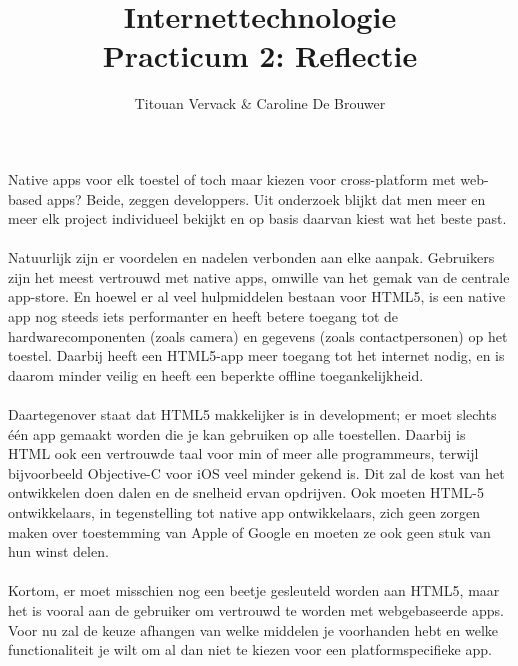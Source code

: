 \documentclass[12pt,a4paper,oneside]{article}
\begin{document}
\title{Internettechnologie \\ Practicum 2: Reflectie}
\author{Titouan Vervack \& Caroline De Brouwer}
\maketitle

\thispagestyle{empty}
Native apps voor elk toestel of toch maar kiezen voor cross-platform met web-based apps? Beide, zeggen developpers. Uit onderzoek blijkt dat men meer en meer elk project individueel bekijkt en op basis daarvan kiest wat het beste past. \\\\
Natuurlijk zijn er voordelen en nadelen verbonden aan elke aanpak. Gebruikers zijn het meest vertrouwd met native apps, omwille van het gemak van de centrale app-store. En hoewel er al veel hulpmiddelen bestaan voor HTML5, is een native app nog steeds iets performanter en heeft betere toegang tot de hardwarecomponenten (zoals camera) en gegevens (zoals contactpersonen) op het toestel. Daarbij heeft een HTML5-app meer toegang tot het internet nodig, en is daarom minder veilig en heeft een beperkte offline toegankelijkheid.\\\\
Daartegenover staat dat HTML5 makkelijker is in development; er moet slechts \'e\'en app gemaakt worden die je kan gebruiken op alle toestellen. Daarbij is HTML ook een vertrouwde taal voor min of meer alle programmeurs, terwijl bijvoorbeeld Objective-C voor iOS veel minder gekend is. Dit zal de kost van het ontwikkelen doen dalen en de snelheid ervan opdrijven. Ook moeten HTML-5 ontwikkelaars, in tegenstelling tot native app ontwikkelaars, zich geen zorgen maken over toestemming van Apple of Google en moeten ze ook geen stuk van hun winst delen.\\\\
Kortom, er moet misschien nog een beetje gesleuteld worden aan HTML5, maar het is vooral aan de gebruiker om vertrouwd te worden met webgebaseerde apps. Voor nu zal de keuze afhangen van welke middelen je voorhanden hebt en welke functionaliteit je wilt om al dan niet te kiezen voor een platformspecifieke app.
\end{document}
